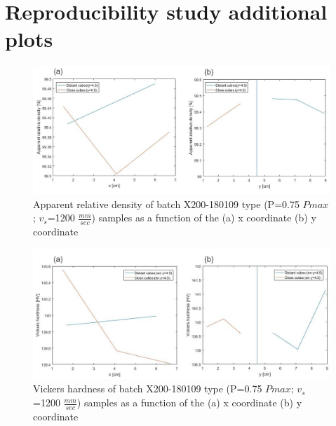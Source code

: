 
\chapter{Reproducibility study additional plots} %

\label{AppendixD} %

\begin{figure}[ht]
\centering
\centerline{\includegraphics[scale=0.55]{Images/180109-7Dxy}}
\decoRule
\caption[Average apparent relative density of batch X200-180109 type (P=0.75 $Pmax$; $v_s$=1200 $\frac{mm}{sec}$) samples as a function of the (a) x coordinate (b) y coordinate]{Apparent relative density of batch X200-180109 type (P=0.75 $Pmax$; $v_s$=1200 $\frac{mm}{sec}$) samples as a function of the (a) x coordinate (b) y coordinate}
\label{180109-7Dxy}
\end{figure} 

\begin{figure}[ht]
\centering
\centerline{\includegraphics[scale=0.55]{Images/180109-7Hxy}}
\decoRule
\caption[Average Vickers hardness of batch X200-180109 type (P=0.75 $Pmax$; $v_s$=1200 $\frac{mm}{sec}$) samples as a function of the (a) x coordinate (b) y coordinate]{Vickers hardness of batch X200-180109 type (P=0.75 $Pmax$; $v_s$=1200 $\frac{mm}{sec}$) samples as a function of the (a) x coordinate (b) y coordinate}
\label{180109-7Hxy}
\end{figure} 

